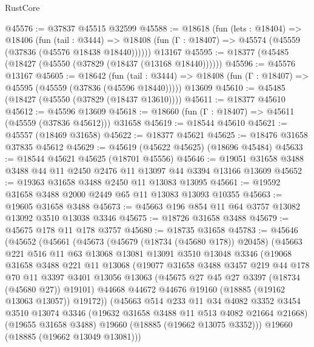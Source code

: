 \begin{lexlean}{RustCore}
\begin{coremodule}
@45576 := @37837 @45515 @32599
@45588 := @18618
    (fun (lets : @18404) =>
    @18406
      (fun (tail : @3444) =>
      @18408 (fun (Γ : @18407) => @45574 (@45559 (@37836 (@45576 @18438 @18440))))))
    @13167
@45595 := @18377 (@45485 (@18427 (@45550 (@37829 (@18437 (@13168 @18440))))))
@45596 := @45576 @13167
@45605 := @18642
    (fun (tail : @3444) => @18408 (fun (Γ : @18407) => @45595 (@45559 (@37836 (@45596 @18440)))))
    @13609
@45610 := @45485 (@18427 (@45550 (@37829 (@18437 @13610))))
@45611 := @18377 @45610
@45612 := @45596 @13609
@45618 := @18660 (fun (Γ : @18407) => @45611 (@45559 (@37836 @45612))) @31658
@45619 := @18544 @45610
@45621 := @45557 (@18469 @31658)
@45622 := @18377 @45621
@45625 := @18476 @31658 @37835 @45612
@45629 := @45619 (@45622 @45625) (@18696 @45484)
@45633 := @18544 @45621 @45625 (@18701 @45556)
@45646 := @19051 @31658 @3488 @3488 @44 @11 @2450 @2476 @11 @13097 @44 @3394 @13166 @13609
@45652 := @19363 @31658 @3488 @2450 @11 @13083 @13095
@45661 := @19592 @31658 @3488 @2000 @2449 @65 @11 @13083 @13093 @10355
@45663 := @19605 @31658 @3488
@45673 := @45663 @196 @854 @11 @64 @3757 @13082 @13092 @3510 @13038 @3346
@45675 := @18726 @31658 @3488
@45679 := @45675 @178 @11 @178 @3757
@45680 := @18735 @31658
@45783 := @45646
    (@45652
      (@45661
        (@45673
          (@45679 (@18734 (@45680 @178)) @20458)
          (@45663
            @221
            @516
            @11
            @63
            @13068
            @13081
            @13091
            @3510
            @13048
            @3346
            (@19068
              @31658
              @3488
              @221
              @11
              @13068
              (@19077
                @31658
                @3488
                @3457
                @219
                @44
                @178
                @70
                @11
                @3397
                @3401
                @13056
                @13063
                (@45675 @27 @45 @27 @3397 (@18734 (@45680 @27)) @19101)
                @44668
                @44672
                @44676
                @19160
                (@18885 (@19162 @13063 @13057))
                @19172))
            (@45663
              @514
              @233
              @11
              @34
              @4082
              @3352
              @3454
              @3510
              @13074
              @3346
              (@19632 @31658 @3488 @11 @513 @4082 @21664 @21668)
              (@19655 @31658 @3488)
              @19660
              (@18885 (@19662 @13075 @3352)))
            @19660
            (@18885 (@19662 @13049 @13081)))

\end{coremodule}
\end{lexlean}
